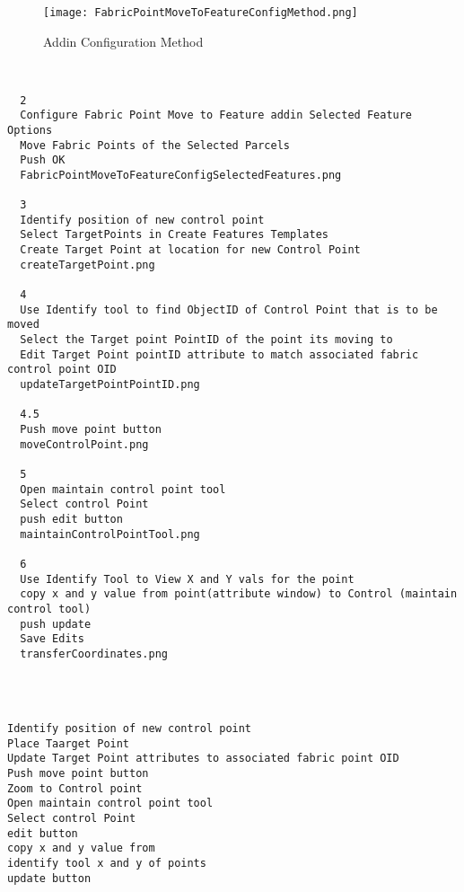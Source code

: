 \documentclass[class=article , crop=false, titlepage, twoside, multi={itemize, figure, verbatim}, float=false]{standalone}
\begin{document}
\begin{figure}[h!]
\centering
    \texttt{[image: FabricPointMoveToFeatureConfigMethod.png]}
\caption{Addin Configuration Method}
\end{figure}
%
%
\clearpage
%
%
%


\begin{verbatim}


  2
  Configure Fabric Point Move to Feature addin Selected Feature Options
  Move Fabric Points of the Selected Parcels
  Push OK
  FabricPointMoveToFeatureConfigSelectedFeatures.png

  3
  Identify position of new control point
  Select TargetPoints in Create Features Templates
  Create Target Point at location for new Control Point
  createTargetPoint.png

  4
  Use Identify tool to find ObjectID of Control Point that is to be moved
  Select the Target point PointID of the point its moving to
  Edit Target Point pointID attribute to match associated fabric control point OID
  updateTargetPointPointID.png

  4.5
  Push move point button
  moveControlPoint.png

  5
  Open maintain control point tool
  Select control Point
  push edit button
  maintainControlPointTool.png

  6
  Use Identify Tool to View X and Y vals for the point
  copy x and y value from point(attribute window) to Control (maintain control tool)
  push update
  Save Edits
  transferCoordinates.png




Identify position of new control point
Place Taarget Point
Update Target Point attributes to associated fabric point OID
Push move point button
Zoom to Control point
Open maintain control point tool
Select control Point
edit button
copy x and y value from
identify tool x and y of points
update button

\end{verbatim}
\end{document}
